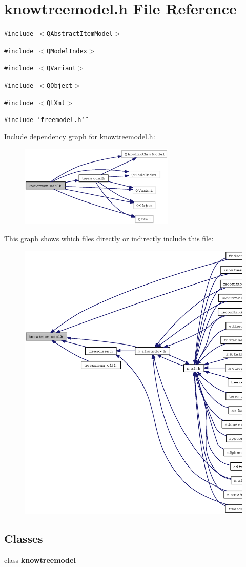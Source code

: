 \section{knowtreemodel.h File Reference}
\label{knowtreemodel_8h}
{\tt \#include $<$QAbstract\-Item\-Model$>$}\par
{\tt \#include $<$QModel\-Index$>$}\par
{\tt \#include $<$QVariant$>$}\par
{\tt \#include $<$QObject$>$}\par
{\tt \#include $<$Qt\-Xml$>$}\par
{\tt \#include \char`\"{}treemodel.h\char`\"{}}\par


Include dependency graph for knowtreemodel.h:\begin{figure}[H]
\begin{center}
\leavevmode
\includegraphics[width=210pt]{knowtreemodel_8h__incl}
\end{center}
\end{figure}


This graph shows which files directly or indirectly include this file:\begin{figure}[H]
\begin{center}
\leavevmode
\includegraphics[width=334pt]{knowtreemodel_8h__dep__incl}
\end{center}
\end{figure}
\subsection*{Classes}
\begin{CompactItemize}
\item 
class {\bf knowtreemodel}
\end{CompactItemize}
